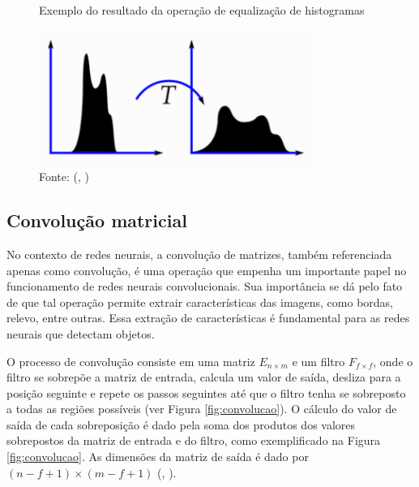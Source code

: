 \documentclass[]{politex}
\begin{document}
\begin{figure}[H]
    \centering
    \caption{Exemplo do resultado da operação de equalização de histogramas}
    \includegraphics[width=0.8\textwidth]{opencv_histograma}
    \caption*{Fonte: (, \citeyear{opencvtutorials})}
    \label{fig:opencv_histograma}
\end{figure}

\subsection{Convolução matricial}
No contexto de redes neurais, a convolução de matrizes, também referenciada apenas como convolução, é uma operação que empenha um importante papel no funcionamento de redes neurais convolucionais. Sua importância se dá pelo fato de que tal operação permite extrair características das imagens, como bordas, relevo, entre outras. Essa extração de características é fundamental para as redes neurais que detectam objetos.

O processo de convolução consiste em uma matriz \(E_{n \times m}\) e um filtro \(F_{f \times f}\), onde o filtro se sobrepõe a matriz de entrada, calcula um valor de saída, desliza para a posição seguinte e repete os passos seguintes até que o filtro tenha se sobreposto a todas as regiões possíveis (ver Figura \ref{fig:convolucao}). O cálculo do valor de saída de cada sobreposição é dado pela soma dos produtos dos valores sobrepostos da matriz de entrada e do filtro, como exemplificado na Figura \ref{fig:convolucao}. As dimensões da matriz de saída é dado por \( (n-f+1) \times (m-f+1)\) (, \citeyear{cnncourse}).
\end{document}
